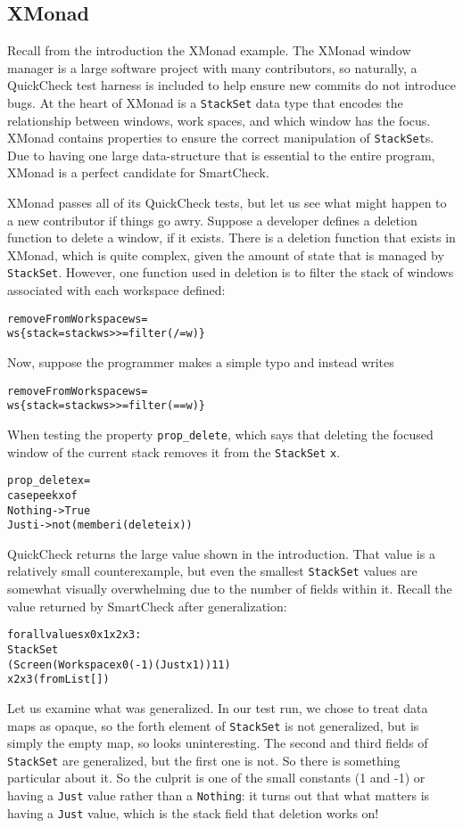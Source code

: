 \documentclass{sigplanconf}
\newenvironment{code}{\begin{alltt}}{\end{alltt}}
\newcommand{\ttp}[1]{\texttt{#1}}
\begin{document}
\subsection{XMonad}
Recall from the introduction the XMonad example.  The XMonad window manager is a
large software project with many contributors, so naturally, a QuickCheck
test harness is included to help ensure new commits do not introduce bugs.  At
the heart of XMonad is a \ttp{StackSet} data type that encodes the relationship
between windows, work spaces, and which window has the focus.  XMonad contains
properties to ensure the correct manipulation of \ttp{StackSet}s.  Due to having
one large data-structure that is essential to the entire program, XMonad is a
perfect candidate for SmartCheck.

XMonad passes all of its QuickCheck tests, but let us see what might happen to a
new contributor if things go awry.  Suppose a developer defines a deletion
function to delete a window, if it exists.  There is a deletion function that
exists in XMonad, which is quite complex, given the amount of state that is managed
by \ttp{StackSet}.  However, one function used in deletion is to filter the
stack of windows associated with each workspace defined:
%
\begin{code}
removeFromWorkspace ws =
  ws \{ stack = stack ws >>= filter (/=w) \}
\end{code}
%
\noindent
Now, suppose the programmer makes a simple typo and instead writes
%
\begin{code}
removeFromWorkspace ws =
  ws \{ stack = stack ws >>= filter (==w) \}
\end{code}
%
\noindent
When testing the property \ttp{prop\_delete}, which says that deleting the
focused window of the current stack removes it from the \ttp{StackSet} \ttp{x}.
%
\begin{code}
prop_delete x =
    case peek x of
        Nothing -> True
        Just i  -> not (member i (delete i x))
\end{code}
%
\noindent
QuickCheck returns the large value shown in the introduction.  That value is a
relatively small counterexample, but even the smallest \ttp{StackSet} values are
somewhat visually overwhelming due to the number of fields within it.  Recall
the value returned by SmartCheck after generalization:
%
\begin{code}
forall values x0 x1 x2 x3:
  StackSet
    (Screen (Workspace x0 (-1) (Just x1)) 1 1)
    x2 x3 (fromList [])
\end{code}
%
\noindent
Let us examine what was generalized.  In our test run, we chose to treat data
maps as opaque, so the forth element of \ttp{StackSet} is not generalized, but
is simply the empty map, so looks uninteresting.  The second and third fields of
\ttp{StackSet} are generalized, but the first one is not.  So there is something
particular about it.  So the culprit is one of the small constants (1 and -1) or
having a \ttp{Just} value rather than a \ttp{Nothing}: it turns out that what
matters is having a \ttp{Just} value, which is the stack field that deletion
works on!
\end{document}
